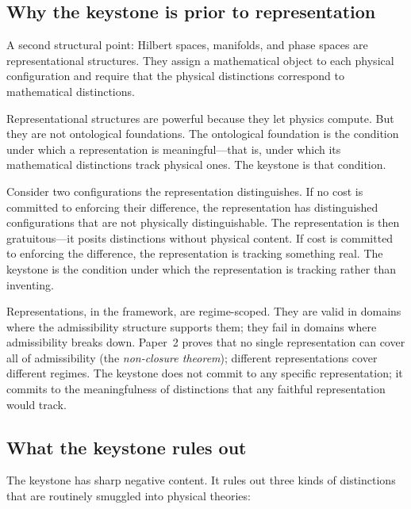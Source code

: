 \documentclass[11pt]{article}
\begin{document}
\subsection{Why the keystone is prior to representation}\label{sec:keystone_prior_rep}

A second structural point: Hilbert spaces, manifolds, and phase spaces are representational structures. They assign a mathematical object to each physical configuration and require that the physical distinctions correspond to mathematical distinctions.

Representational structures are powerful because they let physics compute. But they are not ontological foundations. The ontological foundation is the condition under which a representation is meaningful---that is, under which its mathematical distinctions track physical ones. The keystone is that condition.

Consider two configurations the representation distinguishes. If no cost is committed to enforcing their difference, the representation has distinguished configurations that are not physically distinguishable. The representation is then gratuitous---it posits distinctions without physical content. If cost is committed to enforcing the difference, the representation is tracking something real. The keystone is the condition under which the representation is tracking rather than inventing.

Representations, in the framework, are regime-scoped. They are valid in domains where the admissibility structure supports them; they fail in domains where admissibility breaks down. Paper~2 proves that no single representation can cover all of admissibility (the \emph{non-closure theorem}); different representations cover different regimes. The keystone does not commit to any specific representation; it commits to the meaningfulness of distinctions that any faithful representation would track.

\subsection{What the keystone rules out}\label{sec:keystone_rules_out}

The keystone has sharp negative content. It rules out three kinds of distinctions that are routinely smuggled into physical theories:
\end{document}
